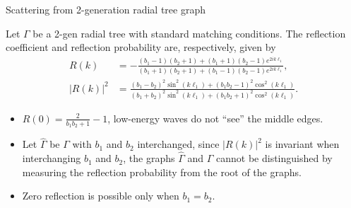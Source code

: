 \documentclass{beamer}
\newcommand{\abs}[1]{\left\lvert#1\right\rvert}
\begin{document}
  \begin{frame}{Scattering from 2-generation radial tree graph}
    \vspace{-0.5em}
    \begin{theorem}
      Let $\Gamma$ be a 2-gen radial tree with standard matching conditions. The reflection coefficient and reflection probability are, respectively, given by
      \vspace{-0.5em}
      \begin{align*}
        R(k) &= -\frac{(b_1-1) (b_2+1)+(b_1+1) (b_2-1) e^{2 i k \ell_1}}{(b_1+1) (b_2+1)+(b_1-1) (b_2-1) e^{2 i k \ell_1}}, \\
        \abs{R(k)}^2 &= \frac{(b_1-b_2)^2 \sin ^2(k \ell_1)+(b_1 b_2-1)^2 \cos ^2(k \ell_1)}{(b_1+b_2)^2 \sin ^2(k \ell_1)+(b_1 b_2+1)^2 \cos ^2(k \ell_1)}.
      \end{align*}
    \end{theorem}
    \vspace{-1em}
    \pause
    \begin{corollary}
      \begin{itemize}
        \item $R(0) = \frac{2}{b_1b_2+1} - 1$, low-energy waves do not ``see'' the middle edges.
        \item Let $\widehat{\Gamma}$ be $\Gamma$ with $b_1$ and $b_2$ interchanged, since $\abs{R(k)}^2$ is invariant when interchanging $b_1$ and $b_2$, the graphs $\widehat{\Gamma}$ and $\Gamma$ cannot be distinguished by measuring the reflection probability from the root of the graphs.
        \item Zero reflection is possible only when $b_1=b_2$.
      \end{itemize}
    \end{corollary}
  \end{frame}
\end{document}
